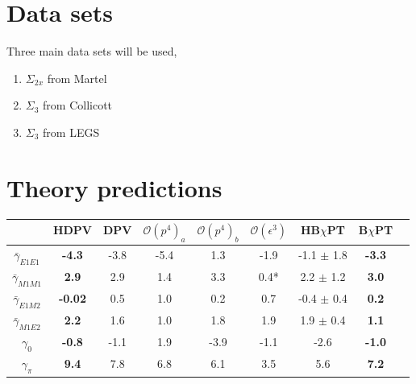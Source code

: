 \documentclass[]{article}
\begin{document}

\section{Data sets}
Three main data sets will be used, 
\begin{enumerate}
	\item $\Sigma_{2x}$ from Martel
	\item $\Sigma_{3}$  from Collicott
	\item $\Sigma_{3}$  from LEGS
\end{enumerate}

\section{Theory predictions}

\begin{table}[h!]
	\centering %
	\begin{tabular}{|c|c|c|c|c|c|c|c|c|} %
		\hline %
		& \textbf{HDPV} & DPV &$\mathcal{O}(p^{4})_a$ & $\mathcal{O}(p^{4})_b$  & $\mathcal{O}(\epsilon^{3})$ & HB$\chi$PT & \textbf{B$\chi$PT} \\ [0.5ex] %
		\hline\hline %
		$\bar{\gamma}_{E1E1}$ & \textbf{-4.3}  & -3.8 & -5.4 & 1.3 & -1.9 & -1.1 $\pm$ 1.8 & \textbf{-3.3} \\ 
		$\bar{\gamma}_{M1M1}$ & \textbf{2.9}   & 2.9  & 1.4  & 3.3 & 0.4* & 2.2 $\pm$ 1.2 &\textbf{3.0} \\
		$\bar{\gamma}_{E1M2}$ & \textbf{-0.02} & 0.5  & 1.0  & 0.2 & 0.7 & -0.4 $\pm$ 0.4 & \textbf{0.2} \\
		$\bar{\gamma}_{M1E2}$ &\textbf{ 2.2 }  & 1.6  & 1.0  & 1.8 & 1.9 & 1.9 $\pm$ 0.4 & \textbf{1.1} \\
		\hline
		$\gamma_{0}$ 		  & \textbf{-0.8} &  -1.1 & 1.9  & -3.9 & -1.1  & -2.6 & \textbf{-1.0} \\
		$\gamma_{\pi}$ 		  &\textbf{9.4}  &   7.8 & 6.8  & 6.1  & 3.5  & 5.6 & \textbf{7.2} \\
		\hline %
	\end{tabular}
\end{table}
\end{document}
